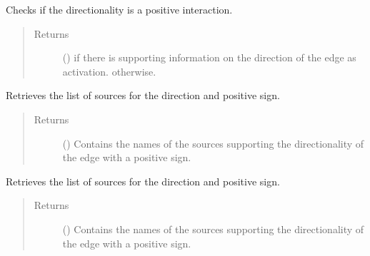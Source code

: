 \documentclass[letterpaper,10pt,english]{sphinxmanual}
\begin{document}
\begin{fulllineitems}
\begin{fulllineitems}
\label{\detokenize{reference:pypath.main.Direction.positive_reverse}}
Checks if the  directionality is a positive
interaction.
\begin{quote}\begin{description}
\item[{Returns}] \leavevmode
() \textendash{}  if there is supporting information on
the  direction of the edge as activation.
 otherwise.

\end{description}\end{quote}

\end{fulllineitems}


\begin{fulllineitems}
\label{\detokenize{reference:pypath.main.Direction.positive_sources_reverse}}
Retrieves the list of sources for the 
direction and positive sign.
\begin{quote}\begin{description}
\item[{Returns}] \leavevmode
() \textendash{} Contains the names of the sources supporting the
 directionality of the edge with a
positive sign.

\end{description}\end{quote}

\end{fulllineitems}


\begin{fulllineitems}
\label{\detokenize{reference:pypath.main.Direction.positive_sources_straight}}
Retrieves the list of sources for the 
direction and positive sign.
\begin{quote}\begin{description}
\item[{Returns}] \leavevmode
() \textendash{} Contains the names of the sources supporting the
 directionality of the edge with a
positive sign.


\end{description}
\end{quote}
\end{fulllineitems}
\end{fulllineitems}
\end{document}
